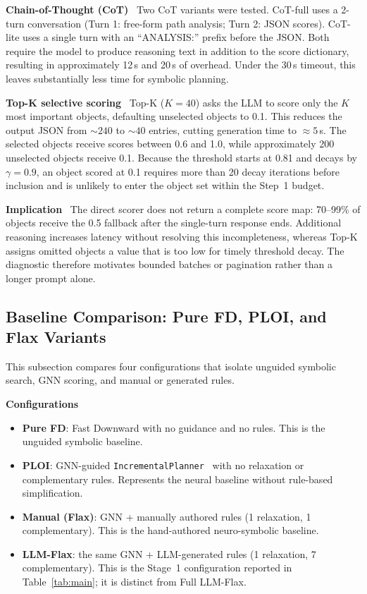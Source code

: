 \documentclass{ieeeaccess}
\newcommand{\tref}[1]{Table~\ref{#1}}
\newcommand{\myparagraph}[1]{\noindent\textbf{#1}~}
\newcommand{\method}{LLM-Flax\xspace}
\newcommand{\fullmethod}{Full LLM-Flax\xspace}
\begin{document}
\myparagraph{Chain-of-Thought (CoT)}
Two CoT variants were tested. CoT-full uses a 2-turn conversation (Turn 1: free-form path analysis; Turn 2: JSON scores). CoT-lite uses a single turn with an ``ANALYSIS:'' prefix before the JSON.
Both require the model to produce reasoning text in addition to the score dictionary, resulting in approximately 12\,s and 20\,s of overhead. Under the 30\,s timeout, this leaves substantially less time for symbolic planning.

\myparagraph{Top-K selective scoring}
Top-K ($K{=}40$) asks the LLM to score only the $K$ most important objects, defaulting unselected objects to 0.1.
This reduces the output JSON from ${\sim}240$ to ${\sim}40$ entries, cutting generation time to ${\approx}5$\,s.
The selected objects receive scores between 0.6 and 1.0, while approximately 200 unselected objects receive 0.1.
Because the threshold starts at 0.81 and decays by $\gamma{=}0.9$, an object scored at 0.1 requires more than 20 decay iterations before inclusion and is unlikely to enter the object set within the Step~1 budget.

\myparagraph{Implication}
The direct scorer does not return a complete score map: 70--99\% of objects receive the 0.5 fallback after the single-turn response ends. Additional reasoning increases latency without resolving this incompleteness, whereas Top-K assigns omitted objects a value that is too low for timely threshold decay.
The diagnostic therefore motivates bounded batches or pagination rather than a longer prompt alone.


\subsection{Baseline Comparison: Pure FD, PLOI, and Flax Variants}
\label{app:baselines}

This subsection compares four configurations that isolate unguided symbolic search, GNN scoring, and manual or generated rules.

\myparagraph{Configurations}
\begin{itemize}[noitemsep,topsep=2pt]
  \item \textbf{Pure FD}: Fast Downward with no guidance and no rules.
    This is the unguided symbolic baseline.
  \item \textbf{PLOI}: GNN-guided \texttt{IncrementalPlanner}~\cite{silver2021planning} with no relaxation or complementary rules.
    Represents the neural baseline without rule-based simplification.
  \item \textbf{Manual (Flax)}: GNN + manually authored rules (1 relaxation, 1 complementary).
    This is the hand-authored neuro-symbolic baseline.
  \item \textbf{\method}: the same GNN + LLM-generated rules (1 relaxation, 7 complementary).
    This is the Stage~1 configuration reported in \tref{tab:main}; it is distinct from \fullmethod.
\end{itemize}
\end{document}
